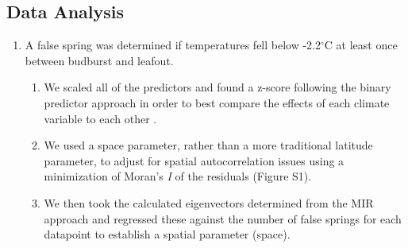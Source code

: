\documentclass{article}\usepackage[]{graphicx}\usepackage[]{color}
\begin{document}
\subsection*{Data Analysis}
\begin{enumerate}
\item A false spring was determined if temperatures fell below -2.2$^{\circ}$C at least once between budburst and leafout.
\begin{enumerate}
\item We scaled all of the predictors and found a z-score following the binary predictor approach in order to best compare the effects of each climate variable to each other \citep{Gelman2006}.
\item We used a space parameter, rather than a more traditional latitude parameter, to adjust for spatial autocorrelation issues using a minimization of Moran's \textit{I} of the residuals \citep{Baumen2017} (Figure S1).
\item We then took the calculated eigenvectors determined from the MIR approach and regressed these against the number of false springs for each datapoint to establish a spatial parameter (space). %
\end{enumerate}


\end{enumerate}
\end{document}
